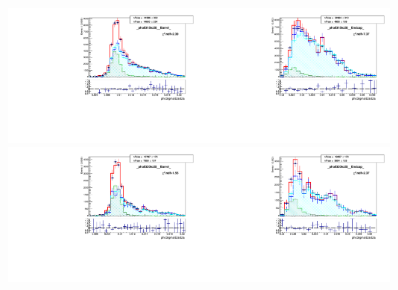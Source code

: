 \begin{figure}[htb]
  \begin{center}
   \includegraphics[width=0.45\textwidth]{../figs/figs_v11/MUON_WGamma/MCclosureWjetsPlusWg/c_TEMPL_SIHIH_UNblind__phoEt15to20__Barrel__RooFit_MCclosure.pdf}\includegraphics[width=0.45\textwidth]{../figs/figs_v11/MUON_WGamma/MCclosureWjetsPlusWg/c_TEMPL_SIHIH_UNblind__phoEt15to20__Endcap__RooFit_MCclosure.pdf}\\
   \includegraphics[width=0.45\textwidth]{../figs/figs_v11/MUON_WGamma/MCclosureWjetsPlusWg/c_TEMPL_SIHIH_UNblind__phoEt20to25__Barrel__RooFit_MCclosure.pdf}\includegraphics[width=0.45\textwidth]{../figs/figs_v11/MUON_WGamma/MCclosureWjetsPlusWg/c_TEMPL_SIHIH_UNblind__phoEt20to25__Endcap__RooFit_MCclosure.pdf}\\

\end{center}
\end{figure}
